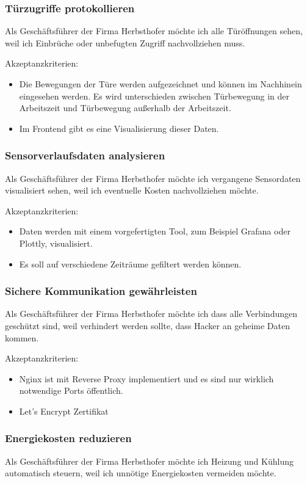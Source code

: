 \subsubsection{Türzugriffe protokollieren}
Als Geschäftsführer der Firma Herbsthofer  möchte ich alle Türöffnungen sehen, weil ich Einbrüche oder unbefugten Zugriff nachvollziehen muss.

Akzeptanzkriterien:
\begin{itemize}
    \item Die Bewegungen der Türe werden aufgezeichnet und können im Nachhinein eingesehen werden. Es wird unterschieden zwischen Türbewegung in der Arbeitszeit und Türbewegung außerhalb der Arbeitszeit.
    \item Im Frontend gibt es eine Visualisierung dieser Daten.
\end{itemize}

\subsubsection{Sensorverlaufsdaten analysieren}
Als Geschäftsführer der Firma Herbsthofer  möchte ich vergangene Sensordaten visualisiert sehen, weil ich eventuelle Kosten nachvollziehen möchte.

Akzeptanzkriterien:
\begin{itemize}
    \item Daten werden mit einem vorgefertigten Tool, zum Beispiel Grafana oder Plottly, visualisiert.
    \item Es soll auf verschiedene Zeiträume gefiltert werden können.
\end{itemize}

\subsubsection{Sichere Kommunikation gewährleisten}
Als Geschäftsführer der Firma Herbsthofer möchte ich dass alle Verbindungen geschützt sind, weil verhindert werden sollte, dass Hacker an geheime Daten kommen.

Akzeptanzkriterien:
\begin{itemize}
    \item Nginx ist mit Reverse Proxy implementiert und es sind nur wirklich notwendige Ports öffentlich.
    \item Let's Encrypt Zertifikat
\end{itemize}

\subsubsection{Energiekosten reduzieren}
Als Geschäftsführer der Firma Herbsthofer möchte ich Heizung und Kühlung automatisch steuern, weil ich unnötige Energiekosten vermeiden möchte.

